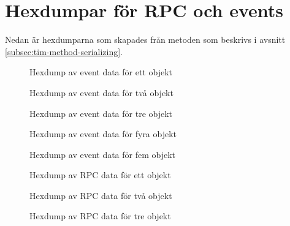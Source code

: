 \section{Hexdumpar för RPC och events}
\label{sec:tim-hexdumps}
Nedan är hexdumparna som skapades från metoden som beskrivs i avsnitt \ref{subsec:tim-method-serializing}.

\begin{figure}[H]
    \scriptsize
    \center
    
    \caption{Hexdump av event data för ett objekt}
    \label{fig:tim-eventdata1}
\end{figure}

\begin{figure}[H]
    \scriptsize
    \center
    
    \caption{Hexdump av event data för två objekt}
    \label{fig:tim-eventdata2}
\end{figure}

\begin{figure}[H]
    \scriptsize
    \center
    
    \caption{Hexdump av event data för tre objekt}
    \label{fig:tim-eventdata3}
\end{figure}

\begin{figure}[H]
    \scriptsize
    \center
    
    \caption{Hexdump av event data för fyra objekt}
    \label{fig:tim-eventdata4}
\end{figure}

\begin{figure}[H]
    \scriptsize
    \center
    
    \caption{Hexdump av event data för fem objekt}
    \label{fig:tim-eventdata5}
\end{figure}

\begin{figure}[H]
    \scriptsize
    \center
    
    \caption{Hexdump av RPC data för ett objekt}
    \label{fig:tim-rpcdata1}
\end{figure}

\begin{figure}[H]
    \scriptsize
    \center
    
    \caption{Hexdump av RPC data för två objekt}
    \label{fig:tim-rpcdata2}
\end{figure}

\begin{figure}[H]
    \scriptsize
    \center
    
    \caption{Hexdump av RPC data för tre objekt}
    \label{fig:tim-rpcdata3}
\end{figure}

